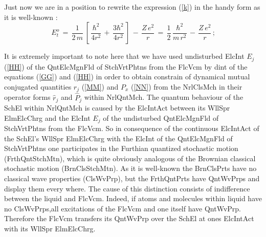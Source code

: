 \documentclass[12pt]{article}
\begin{document}
 Just now we are in a position to rewrite the expression (\ref{k}) in the
handy form as it is well-known :
\begin{equation}\label{p}
\,E_t^o\,=\,\frac{1}{2\,m}\,\left[\,\frac{\hbar^2}{4r^2}\,+
\,\frac{3\hbar^2}{4r^2}\,\right]\,-\,\frac{Z\,e^2}{r}\,=
\,\frac{1}{2}\,\frac{\hbar^2}{m\,r^2}\,-\,\frac{Z\,e^2}{r}\,;
\end{equation}

 It is extremely important to note here that we have used undisturbed ElcInt
$E_j$ (\ref{HH}) of the QntElcMgnFld of StchVrtPhtns from the FlcVcm by dint
of the equations (\ref{GG}) and (\ref{HH}) in order to obtain constrain of
dynamical mutual conjugated quantities $r_j$ (\ref{MM}) and $P_x$ (\ref{NN})
from the NrlClsMch in their operator forms ${\hat r}_j$ and ${\hat P}_j$ within
NrlQntMch. The quantum behaviour of the SchEl within NrlQntMch is caused by
the ElcIntAct between its WllSpr ElmElcChrg and the ElcInt $E_j$ of the
undisturbed QntElcMgnFld of StchVrtPhtns from the FlcVcm. So in consequence
of the continuous ElcIntAct of the SchEl's WllSpr ElmElcChrg with the ElcInt of
the QntElcMgnFld of StchVrtPhtns one participates in the Furthian quantized
stochastic motion (FrthQntStchMtn), which is quite obviously analogous of the
Brownian classical stochastic motion (BrnClsStchMtn). As it is well-known the
BrnClsPrts have no classical wave properties (ClsWvPrp), but the FrthQntPrts
have QntWvPrps and display them every where. The cause of this distinction
consists of indifference between the liquid and FlcVcm. Indeed, if atoms
and molecules within liquid have no ClsWvPrps,all excitations of the FlcVcm
and one itself have QntWvPrp. Therefore the FlcVcm transfers its QntWvPrp
over the SchEl at ones ElcIntAct with its WllSpr ElmElcChrg.

\vspace{1cm}
\end{document}
